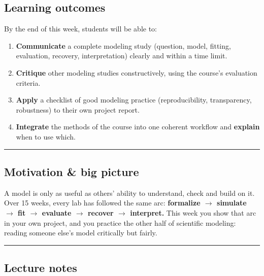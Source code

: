 \subsection{Learning outcomes}

By the end of this week, students will be able to:

\begin{enumerate}
\def\labelenumi{\arabic{enumi}.}
\tightlist
\item
  \textbf{Communicate} a complete modeling study (question, model,
  fitting, evaluation, recovery, interpretation) clearly and within a
  time limit.
\item
  \textbf{Critique} other modeling studies constructively, using the
  course's evaluation criteria.
\item
  \textbf{Apply} a checklist of good modeling practice (reproducibility,
  transparency, robustness) to their own project report.
\item
  \textbf{Integrate} the methods of the course into one coherent
  workflow and \textbf{explain} when to use which.
\end{enumerate}

\begin{center}\rule{0.5\linewidth}{0.5pt}\end{center}

\subsection{Motivation \& big picture}

A model is only as useful as others' ability to understand, check and
build on it. Over 15 weeks, every lab has followed the same arc:
\textbf{formalize \ensuremath{\rightarrow} simulate \ensuremath{\rightarrow} fit \ensuremath{\rightarrow} evaluate \ensuremath{\rightarrow} recover \ensuremath{\rightarrow} interpret.}
This week you show that arc in your own project, and you practice the
other half of scientific modeling: reading someone else's model
critically but fairly.

\begin{center}\rule{0.5\linewidth}{0.5pt}\end{center}


\subsection{Lecture notes}

